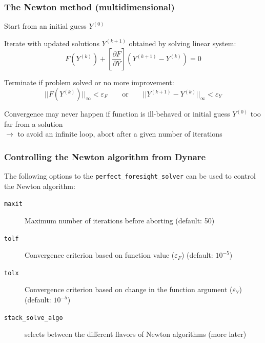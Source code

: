 \documentclass[handout,usepdftitle=false,xcolor=dvipsnames,aspectratio=169]{beamer}
\begin{document}
\begin{frame}\frametitle{The Newton method (multidimensional)}
  \begin{witemize}
    \item Start from an initial guess $Y^{(0)}$
    \item Iterate with updated solutions $Y^{(k+1)}$ obtained by solving linear
    system:
    \begin{equation}
      F(Y^{(k)}) + \left[\frac{\partial F}{\partial Y}\right]\left(Y^{(k+1)}
      -Y^{(k)}\right) = 0
    \end{equation}
    \item Terminate if problem solved or no more improvement:
    \begin{equation}
      ||F(Y^{(k)})||_\infty <
      \varepsilon_F \qquad \text{or} \qquad  ||Y^{(k+1)}-Y^{(k)}||_\infty < \varepsilon_Y
    \end{equation}
    \item Convergence may never happen if function is ill-behaved or initial guess $Y^{(0)}$ too far
    from a solution \\
    $\rightarrow$ to avoid an infinite loop, abort after a given number of iterations
  \end{witemize}
\end{frame}

\begin{frame}
  \frametitle{Controlling the Newton algorithm from Dynare}
  The following options to the \texttt{perfect\_foresight\_solver} can be used
  to control the Newton algorithm:
  \begin{description}
    \item[\texttt{maxit}] Maximum number of iterations before aborting (default: 50)

    \item[\texttt{tolf}] Convergence criterion based on function value ($\varepsilon_F$)
          (default: $10^{-5}$)
    \item[\texttt{tolx}] Convergence criterion based on change in the function argument ($\varepsilon_Y$)
          (default: $10^{-5}$)
    \item[\texttt{stack\_solve\_algo}] selects between the different flavors of Newton
          algorithms (more later)
  \end{description}
\end{frame}
\end{document}
